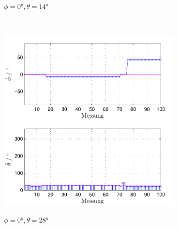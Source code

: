 \begin{figure}
\begin{subfigure}[b]{0.48\textwidth}
                \label{fig:Foto_DSP_Draufsicht}
                \caption{$\phi=0°, \theta = 14°$}
        \end{subfigure}
        ~ %
        \begin{subfigure}[b]{0.48\textwidth}
                \centering
                \includegraphics[width=\textwidth]{grafiken/04_Echtzeitversuch/MALE_Phi_0_Theta_28}
                \label{fig:Foto_DSP_Draufsicht}
                \caption{$\phi=0°, \theta = 28°$}
        \end{subfigure}
         ~ %
        \begin{subfigure}[b]{0.48\textwidth}
                \centering

\end{subfigure}
\end{figure}
